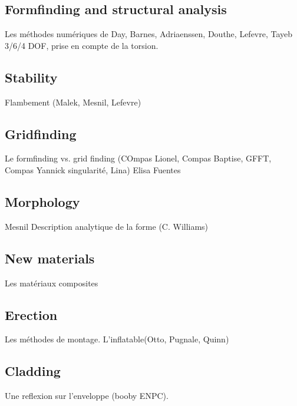 \cite{Labonnote2016,Fernandes2016}

\subsection{Formfinding and structural analysis}
Les méthodes numériques de Day, Barnes, Adriaenssen, Douthe, Lefevre, Tayeb
3/6/4 DOF, prise en compte de la torsion.
\citet{Adriaenssens1999, Adriaenssens2001}
\cite{Barnes2013}
\cite{DAmico2014}
\cite{DAmico2016}
\cite{Poulsen2015}
\cite{Vaulot2016}

\cite{DuPeloux2015}
\citet{Malek2012}

\subsection{Stability}
Flambement (Malek, Mesnil, Lefevre)
\citet{Mesnil2013}
\citet{Mesnil2015a}
\citet{Mesnil2017a}
\citet{Lefevre2015}
\citet{Tayeb2013}

\subsection{Gridfinding}
Le formfinding vs. grid finding (COmpas Lionel, Compas Baptise, GFFT, Compas Yannick singularité, Lina)
Elisa Fuentes

\cite{Pone2016}
\cite{DuPeloux2011}
\cite{Lafuente2015}
\cite{Masson2017}

\subsection{Morphology}
\cite{Douthe2016a}
\cite{Jensen2013}
Mesnil
Description analytique de la forme (C. Williams)

\subsection{New materials}
Les matériaux composites

\subsection{Erection}
Les méthodes de montage. L'inflatable(Otto, Pugnale, Quinn)
\cite{IL10}
\cite{Quinn2014}
\cite{Liuti2015}
\citet{Liuti2016}

\subsection{Cladding}
Une reflexion sur l'enveloppe (booby ENPC).
\citet{Lafuente2014}
\citet{Cuvilliers2017}
\cite{Filz2015}

